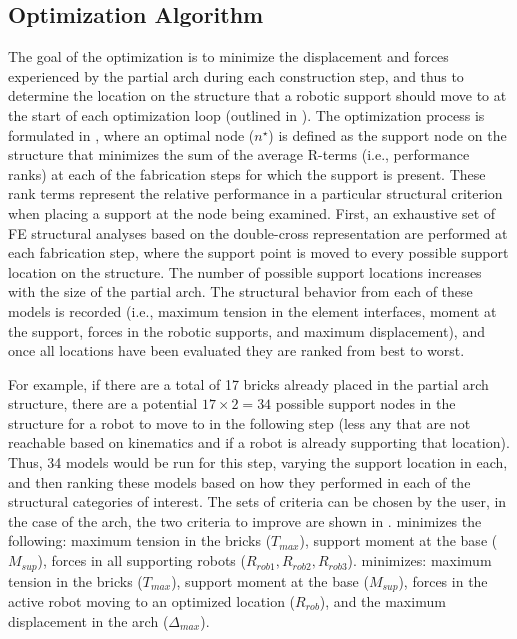 \subsection{Optimization Algorithm}\label{sec:opt_algo}
The goal of the optimization is to minimize the displacement and forces experienced by the partial arch during each construction step, and thus to determine the location on the structure that a robotic support should move to at the start of each optimization loop (outlined in ). The optimization process is formulated in , where an optimal node ($n^{\star}$) is defined as the support node on the structure that minimizes the sum of the average R-terms (i.e., performance ranks) at each of the fabrication steps for which the support is present. These rank terms represent the relative performance in a particular structural criterion when placing a support at the node being examined. First, an exhaustive set of FE structural analyses based on the double-cross representation are performed at each fabrication step, where the support point is moved to every possible support location on the structure. The number of possible support locations increases with the size of the partial arch. The structural behavior from each of these models is recorded (i.e., maximum tension in the element interfaces, moment at the support, forces in the robotic supports, and maximum displacement), and once all locations have been evaluated they are ranked from best to worst.

For example, if there are a total of 17 bricks already placed in the partial arch structure, there are a potential $17 \times 2 = 34 $ possible support nodes in the structure for a robot to move to in the following step (less any that are not reachable based on kinematics and if a robot is already supporting that location). Thus, 34 models would be run for this step, varying the support location in each, and then ranking these models based on how they performed in each of the structural categories of interest. The sets of criteria can be chosen by the user, in the case of the arch, the two criteria to improve are shown in .  minimizes the following: maximum tension in the bricks ($T_{max}$), support moment at the base ($M_{sup}$), forces in all supporting robots ($R_{rob1}, R_{rob2}, R_{rob3}$).  minimizes: maximum tension in the bricks ($T_{max}$), support moment at the base ($M_{sup}$), forces in the active robot moving to an optimized location ($R_{rob}$), and the maximum displacement in the arch ($\Delta_{max}$). 

